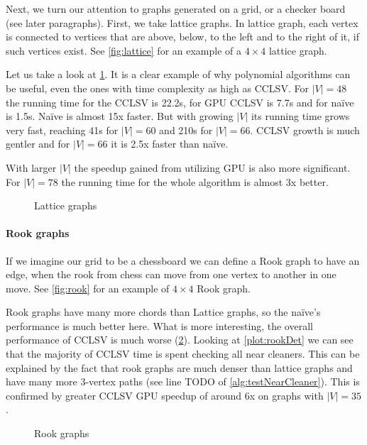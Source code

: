 Next, we turn our attention to graphs generated on a grid, or a checker board (see later paragraphs). First, we take lattice graphs. In lattice graph, each vertex is connected to vertices that are above, below, to the left and to the right of it, if such vertices exist. See \cref{fig:lattice} for an example of a $4 \times 4$ lattice graph.

Let us take a look at \cref{plot:gridLines}. It is a clear example of why polynomial algorithms can be useful, even the ones with time complexity as high as CCLSV. For $|V| = 48$ the running time for the CCLSV is 22.2s, for GPU CCLSV is 7.7s and for na\"ive is 1.5s. Na\"ive is almost 15x faster. But with growing $|V|$ its running time grows very fast, reaching 41s for $|V| = 60$ and 210s for $|V| = 66$. CCLSV growth is much gentler and for $|V| = 66$ it is 2.5x faster than na\"ive.

With larger $|V|$ the speedup gained from utilizing GPU is also more significant. For $|V| = 78$ the running time for the whole algorithm is almost 3x better.

\begin{figure}
  \centering
  
  \label{plot:gridLines}
  \caption{Lattice graphs}
\end{figure}

\paragraph{Rook graphs}

If we imagine our grid to be a chessboard we can define a Rook graph to have an edge, when the rook from chess can move from one vertex to another in one move. See \cref{fig:rook} for an example of $4 \times 4$ Rook graph.

Rook graphs have many more chords than Lattice graphs, so the na\"ive's performance is much better here. What is more interesting, the overall performance of CCLSV is much worse (\cref{plot:rookLines}). Looking at \cref{plot:rookDet} we can see that the majority of CCLSV time is spent checking all near cleaners. This can be explained by the fact that rook graphs are much denser than lattice graphs and have many more 3-vertex paths (see line TODO of \cref{alg:testNearCleaner}). This is confirmed by greater CCLSV GPU speedup of around 6x on graphs with $|V| = 35$.

\begin{figure}
  \centering
  
  \label{plot:rookLines}
  \caption{Rook graphs}
\end{figure}

